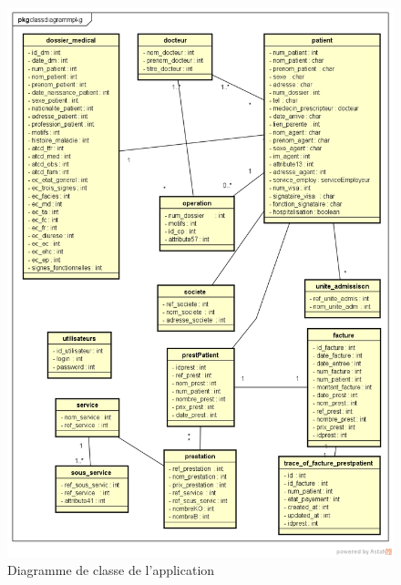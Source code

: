 	  \begin{figure}[h]
	  	  \includegraphics[scale=0.75]{Chapitre2/images/classDiagramme}
	  \caption{Diagramme de classe de l'application}
	  	  \end{figure}
	  
	  
	 
	  
	  
	  
	  
